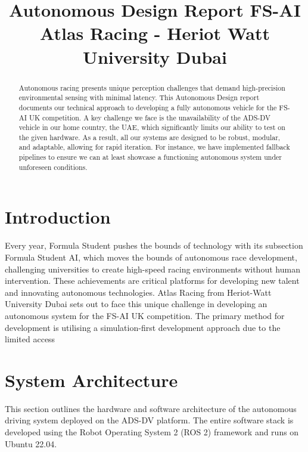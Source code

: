 \documentclass[conference]{IEEEtran}
\begin{document}
\title{Autonomous Design Report FS-AI\\[-0.3em]
{\Large Atlas Racing - Heriot Watt University Dubai}\\[-0.6em]
}

\author{
}

\maketitle

\begin{abstract}
Autonomous racing presents unique perception challenges that demand high-precision environmental sensing with minimal latency. This Autonomous Design report documents our technical approach to developing a fully autonomous vehicle for the FS-AI UK competition. A key challenge we face is the unavailability of the ADS-DV vehicle in our home country, the UAE, which significantly limits our ability to test on the given hardware. As a result, all our systems are designed to be robust, modular, and adaptable, allowing for rapid iteration. For instance, we have implemented fallback pipelines to ensure we can at least showcase a functioning autonomous system under unforeseen conditions.
\end{abstract}

\section{Introduction}
Every year, Formula Student pushes the bounds of technology with its subsection Formula Student AI, which moves the bounds of autonomous race development, challenging universities to create high-speed racing environments without human intervention. These achievements are critical platforms for developing new talent and innovating autonomous technologies.
Atlas Racing from Heriot-Watt University Dubai sets out to face this unique challenge in developing an autonomous system for the FS-AI UK competition. The primary method for development is utilising a simulation-first development approach due to the limited access 
\section{System Architecture}
This section outlines the hardware and software architecture of the autonomous driving system deployed on the ADS-DV platform.  The entire software stack is developed using the Robot Operating System 2 (ROS 2) framework and runs on Ubuntu 22.04.
\end{document}
